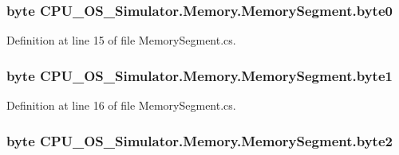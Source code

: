 \subsubsection[{byte0}]{\setlength{\rightskip}{0pt plus 5cm}byte C\+P\+U\+\_\+\+O\+S\+\_\+\+Simulator.\+Memory.\+Memory\+Segment.\+byte0\hspace{0.3cm}{\ttfamily [private]}}\label{class_c_p_u___o_s___simulator_1_1_memory_1_1_memory_segment_a97b8721f717e2fd03673d9dd96882ef8}


Definition at line 15 of file Memory\+Segment.\+cs.

\hypertarget{class_c_p_u___o_s___simulator_1_1_memory_1_1_memory_segment_aa64e7a88f9cdf5dbb5b0c846cc570a77}{}
\subsubsection[{byte1}]{\setlength{\rightskip}{0pt plus 5cm}byte C\+P\+U\+\_\+\+O\+S\+\_\+\+Simulator.\+Memory.\+Memory\+Segment.\+byte1\hspace{0.3cm}{\ttfamily [private]}}\label{class_c_p_u___o_s___simulator_1_1_memory_1_1_memory_segment_aa64e7a88f9cdf5dbb5b0c846cc570a77}


Definition at line 16 of file Memory\+Segment.\+cs.

\hypertarget{class_c_p_u___o_s___simulator_1_1_memory_1_1_memory_segment_a4f6ad3b2d132bfc1c4bd16d8fcca8d56}{}
\subsubsection[{byte2}]{\setlength{\rightskip}{0pt plus 5cm}byte C\+P\+U\+\_\+\+O\+S\+\_\+\+Simulator.\+Memory.\+Memory\+Segment.\+byte2\hspace{0.3cm}{\ttfamily [private]}}\label{class_c_p_u___o_s___simulator_1_1_memory_1_1_memory_segment_a4f6ad3b2d132bfc1c4bd16d8fcca8d56}


